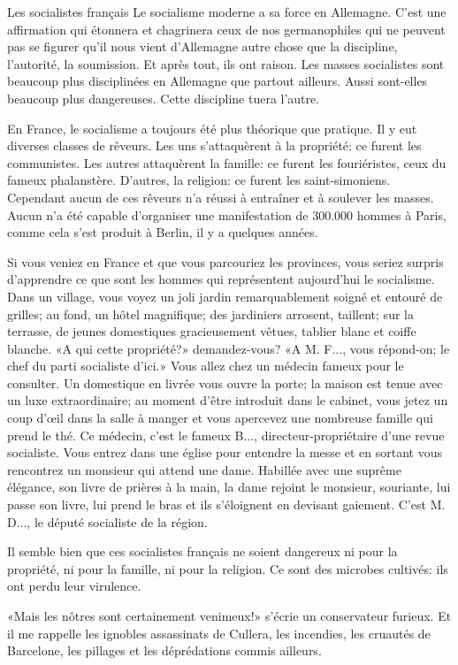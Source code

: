 \begin{chapter}{Les socialistes français}
Le socialisme moderne a sa force en Allemagne. C'est une affirmation qui
étonnera et chagrinera ceux de nos germanophiles qui ne peuvent pas se
figurer qu'il nous vient d'Allemagne autre chose que la discipline,
l'autorité, la soumission. Et après tout, ils ont raison. Les masses
socialistes sont beaucoup plus disciplinées en Allemagne que partout
ailleurs. Aussi sont-elles beaucoup plus dangereuses. Cette discipline
tuera l'autre.

En France, le socialisme a toujours été plus théorique que pratique. Il
y eut diverses classes de rêveurs. Les uns s'attaquèrent à la propriété:
ce furent les communistes. Les autres attaquèrent la famille: ce furent
les fouriéristes, ceux du fameux phalanstère. D'autres, la religion: ce
furent les saint-simoniens. Cependant aucun de ces rêveurs n'a réussi à
entraîner et à soulever les masses. Aucun n'a été capable d'organiser
une manifestation de 300.000 hommes à Paris, comme cela s'est produit à
Berlin, il y a quelques années.

Si vous veniez en France et que vous parcouriez les provinces, vous
seriez surpris d'apprendre ce que sont les hommes qui représentent
aujourd'hui le socialisme. Dans un village, vous voyez un joli jardin
remarquablement soigné et entouré de grilles; au fond, un hôtel
magnifique; des jardiniers arrosent, taillent; sur la terrasse, de
jeunes domestiques gracieusement vêtues, tablier blanc et coiffe
blanche. «A qui cette propriété?» demandez-vous? «A M. F..., vous
répond-on; le chef du parti socialiste d'ici.» Vous allez chez un
médecin fameux pour le consulter. Un domestique en livrée vous ouvre la
porte; la maison est tenue avec un luxe extraordinaire; au moment d'être
introduit dans le cabinet, vous jetez un coup d'œil dans la salle à
manger et vous apercevez une nombreuse famille qui prend le thé. Ce
médecin, c'est le fameux B..., directeur-propriétaire d'une revue
socialiste. Vous entrez dans une église pour entendre la messe et en
sortant vous rencontrez un monsieur qui attend une dame. Habillée avec
une suprême élégance, son livre de prières à la main, la dame rejoint le
monsieur, souriante, lui passe son livre, lui prend le bras et ils
s'éloignent en devisant gaiement. C'est M. D..., le député socialiste de
la région.

Il semble bien que ces socialistes français ne soient dangereux ni pour
la propriété, ni pour la famille, ni pour la religion. Ce sont des
microbes cultivés: ils ont perdu leur virulence.

«Mais les nôtres sont certainement venimeux!» s'écrie un conservateur
furieux. Et il me rappelle les ignobles assassinats de Cullera, les
incendies, les cruautés de Barcelone, les pillages et les déprédations
commis ailleurs.


\end{chapter}
